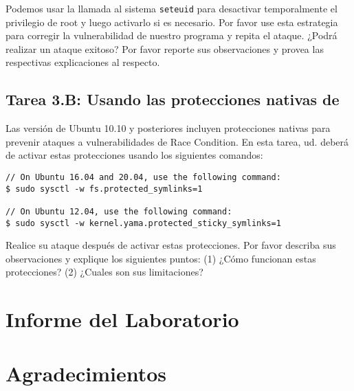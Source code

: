 Podemos usar la llamada al sistema  {\tt seteuid{}} para desactivar temporalmente el privilegio de root y luego activarlo si es necesario. Por favor use esta estrategia para corregir la vulnerabilidad de nuestro programa y repita el ataque. ¿Podrá realizar un ataque exitoso? Por favor reporte sus observaciones y provea las respectivas explicaciones al respecto.


\subsection{Tarea 3.B: Usando las protecciones nativas de \ubuntu}

Las versión de Ubuntu 10.10 y posteriores incluyen protecciones nativas para prevenir ataques a vulnerabilidades de Race Condition.
En esta tarea, ud. deberá de activar estas protecciones usando los siguientes comandos: 

\begin{lstlisting}
// On Ubuntu 16.04 and 20.04, use the following command:
$ sudo sysctl -w fs.protected_symlinks=1

// On Ubuntu 12.04, use the following command:
$ sudo sysctl -w kernel.yama.protected_sticky_symlinks=1
\end{lstlisting}

Realice su ataque después de activar estas protecciones.
Por favor describa sus observaciones y explique los siguientes puntos:
(1) ¿Cómo funcionan estas protecciones? 
(2) ¿Cuales son sus limitaciones?




\section{Informe del Laboratorio}



\section{Agradecimientos}





